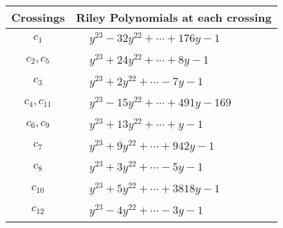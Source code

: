 \documentclass[1p]{elsarticle_modified}
\theoremstyle{definition}
\begin{document}
\begin{tabular}{m{50pt}|m{274pt}}
Crossings & \hspace{64pt}Riley Polynomials at each crossing \\
\hline $$\begin{aligned}c_{1}\end{aligned}$$&$\begin{aligned}
&y^{23}-32 y^{22}+\cdots+176 y-1
\end{aligned}$\\
\hline $$\begin{aligned}c_{2},c_{5}\end{aligned}$$&$\begin{aligned}
&y^{23}+24 y^{22}+\cdots+8 y-1
\end{aligned}$\\
\hline $$\begin{aligned}c_{3}\end{aligned}$$&$\begin{aligned}
&y^{23}+2 y^{22}+\cdots-7 y-1
\end{aligned}$\\
\hline $$\begin{aligned}c_{4},c_{11}\end{aligned}$$&$\begin{aligned}
&y^{23}-15 y^{22}+\cdots+491 y-169
\end{aligned}$\\
\hline $$\begin{aligned}c_{6},c_{9}\end{aligned}$$&$\begin{aligned}
&y^{23}+13 y^{22}+\cdots+y-1
\end{aligned}$\\
\hline $$\begin{aligned}c_{7}\end{aligned}$$&$\begin{aligned}
&y^{23}+9 y^{22}+\cdots+942 y-1
\end{aligned}$\\
\hline $$\begin{aligned}c_{8}\end{aligned}$$&$\begin{aligned}
&y^{23}+3 y^{22}+\cdots-5 y-1
\end{aligned}$\\
\hline $$\begin{aligned}c_{10}\end{aligned}$$&$\begin{aligned}
&y^{23}+5 y^{22}+\cdots+3818 y-1
\end{aligned}$\\
\hline $$\begin{aligned}c_{12}\end{aligned}$$&$\begin{aligned}
&y^{23}-4 y^{22}+\cdots-3 y-1
\end{aligned}$\\
\hline
\end{tabular}\\~\\
\end{document}
